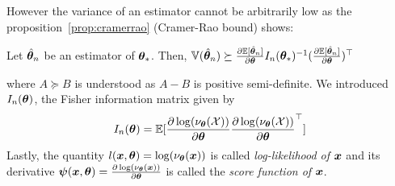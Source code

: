 However the variance of an estimator cannot be arbitrarily low as the
proposition~\ref{prop:cramerrao} (Cramer-Rao bound) shows:
\begin{prop}
  \label{prop:cramerrao}
  Let $\hat{\boldsymbol{\theta}}_n$ be an estimator of $\boldsymbol{\theta}_*$.
  Then, $\mathbb{V}(\hat{\boldsymbol{\theta}}_n) \succeq
  \frac{ \partial \mathbb{E}[\hat{\boldsymbol{\theta}}_n]}{\partial \boldsymbol{\theta}}I_n(\boldsymbol{\theta}_*)^{-1} (\frac{ \partial \mathbb{E}[\hat{\boldsymbol{\theta}}_n]}{\partial \boldsymbol{\theta}})^{\top}$
\end{prop}
where $A \succeq B$ is understood as $A-B$ is positive semi-definite.
We introduced $I_n(\boldsymbol{\theta})$, the Fisher information matrix given by
\begin{align}
  I_n(\boldsymbol{\theta}) = \mathbb{E}[\frac{ \partial \log(\nu_{\boldsymbol{\theta}}(\mathcal{X}))}{\partial \boldsymbol{\theta}} \frac{ \partial \log(\nu_{\boldsymbol{\theta}}(\mathcal{X}))}{\partial \boldsymbol{\theta}}^{\top}]
\end{align}
Lastly, the quantity $l(\boldsymbol{x}, \boldsymbol{\theta}) = \log(\nu_{\boldsymbol{\theta}}(\boldsymbol{x}))$ is called
\emph{log-likelihood of $\boldsymbol{x}$} and its derivative $\boldsymbol{\psi}(\boldsymbol{x}, \boldsymbol{\theta}) =
\frac{ \partial \log(\nu_{\boldsymbol{\theta}}(\boldsymbol{x}))}{\partial \boldsymbol{\theta}}$ is called the \emph{score
  function of $\boldsymbol{x}$}. 
